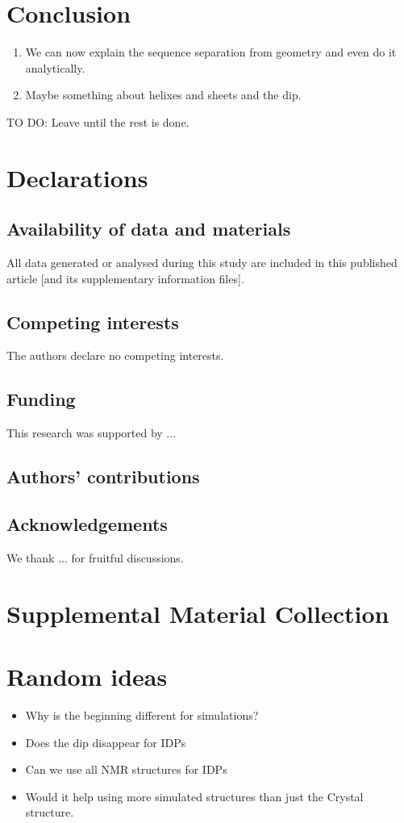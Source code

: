 \documentclass[reprint,amsmath,amssymb,rmp,onecolumn,notitlepage,11pt]{revtex4-1}
\begin{document}
\section*{Conclusion}
\begin{enumerate}
    \item We can now explain the sequence separation from geometry and even do it analytically.
    \item Maybe something about helixes and sheets and the dip.
\end{enumerate}
TO DO: Leave until the rest is done.
\section*{Declarations}
\subsection{Availability of data and materials}
All data generated or analysed during this study are included in this published article [and its supplementary information files].
\subsection{Competing interests}
The authors declare no competing interests.
\subsection{Funding}
This research was supported by ...
\subsection{Authors' contributions}

\subsection{Acknowledgements}
We thank ... for fruitful discussions.




\appendix
\section{Supplemental Material Collection}
\section{Random ideas}
\begin{itemize}
    \item Why is the beginning different for simulations?
    \item Does the dip disappear for IDPs
    \item Can we use all NMR structures for IDPs
    \item Would it help using more simulated structures than just the Crystal structure. 
\end{itemize}
\end{document}
